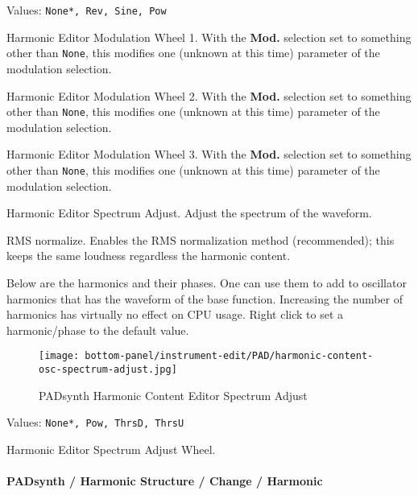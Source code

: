    Values: \texttt{None*, Rev, Sine, Pow}

   Harmonic Editor Modulation Wheel 1.
   With the \textbf{Mod.} selection set to something other than
   \texttt{None}, this modifies one (unknown at this time) parameter of the
   modulation selection.

   Harmonic Editor Modulation Wheel 2.
   With the \textbf{Mod.} selection set to something other than
   \texttt{None}, this modifies one (unknown at this time) parameter of the
   modulation selection.

   Harmonic Editor Modulation Wheel 3.
   With the \textbf{Mod.} selection set to something other than
   \texttt{None}, this modifies one (unknown at this time) parameter of the
   modulation selection.

   Harmonic Editor Spectrum Adjust.
   Adjust the spectrum of the waveform.

   RMS normalize. Enables the RMS normalization method (recommended); this
   keeps the same loudness regardless the harmonic content.

   Below are the harmonics and their phases. One can use them to add to
   oscillator harmonics that has the waveform of the base function.
   Increasing the number of harmonics has virtually no effect on CPU usage. 
   Right click to set a harmonic/phase to the default value. 

\begin{figure}[H]
   \centering 
   \texttt{[image: bottom-panel/instrument-edit/PAD/harmonic-content-osc-spectrum-adjust.jpg]}
   \caption{PADsynth Harmonic Content Editor Spectrum Adjust}
   \label{fig:padsynth_harmonic_content_editor_spectrum_adjust}
\end{figure}

   Values: \texttt{None*, Pow, ThrsD, ThrsU}

   Harmonic Editor Spectrum Adjust Wheel.

\paragraph{PADsynth / Harmonic Structure / Change / Harmonic}
\label{paragraph:padsynth_harmonic_structure_change_harmonic}

